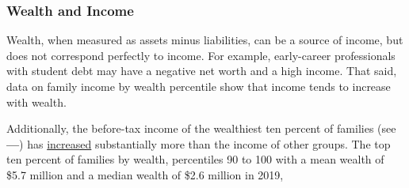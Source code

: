 \documentclass{report}
\begin{document}
{\begin{minipage}{0.76\textwidth}
\subsubsection*{Wealth and Income}
\small Wealth, when measured as assets minus liabilities, can be a source of income, but does not correspond perfectly to income. For example, early-career professionals with student debt may have a negative net worth and a high income. That said, data on family income by wealth percentile show that income tends to increase with wealth. 

Additionally, the before-tax income of the wealthiest ten percent of families (see {\color{blue!80!cyan!80!black}\textbf{---}}) has \href{https://www.federalreserve.gov/econres/scf/dataviz/scf/chart/#series:Before_Tax_Income;demographic:nwcat;population:1,2,3,4,5;units:median}{increased} substantially more than the income of other groups. The top ten percent of families by wealth, percentiles 90 to 100 with a mean wealth of \$5.7 million and a median wealth of \$2.6 million in 2019,  
\end{minipage}
\vspace{1mm}

}
\end{document}
